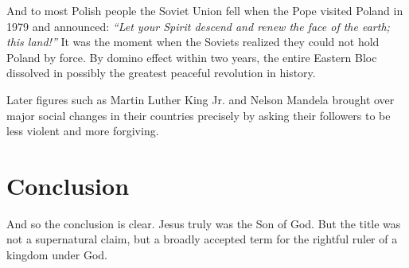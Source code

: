 And to most Polish people the Soviet Union fell when the Pope visited Poland in 1979 and announced:
\emph{“Let your Spirit descend and renew the face of the earth; this land!”}
It was the moment when the Soviets realized they could not hold Poland by force.
By domino effect within two years, the entire Eastern Bloc dissolved in possibly the greatest peaceful revolution in history.

Later figures such as Martin Luther King Jr. and Nelson Mandela brought over major social changes in their countries precisely by asking their followers to be less violent and more forgiving.

\section{Conclusion}\label{sec:conclusion}
And so the conclusion is clear.
Jesus truly was the Son of God.
But the title was not a supernatural claim, but a broadly accepted term for the rightful ruler of a kingdom under God.
